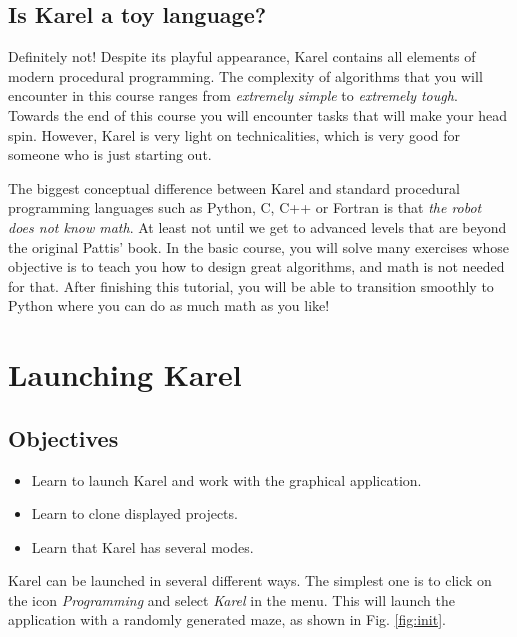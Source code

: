\subsection{Is Karel a toy language?}

Definitely not! Despite its playful appearance, Karel contains all elements 
of modern procedural programming. The complexity of algorithms 
that you will encounter in this course ranges from {\em extremely simple} 
to {\em extremely tough}. Towards the end of this course you will encounter 
tasks that will make your head spin. However, Karel is very light on 
technicalities, which is very good for someone who is just starting out.

The biggest conceptual difference between Karel and standard procedural
programming languages such as Python, C, C++ or Fortran is that {\em the robot does not 
know math}. At least not until we get to advanced levels that are beyond 
the original Pattis' book. In the basic course, you will solve many exercises 
whose objective is to teach you how to design great algorithms, and math is 
not needed for that. After finishing this tutorial, you will be able to transition 
smoothly to Python where you can do as much math as you like!
 
\section{Launching Karel}

\subsection{Objectives} 
\begin{itemize}
\item Learn to launch Karel and work with the graphical application.
\item Learn to clone displayed projects.
\item Learn that Karel has several modes.
\end{itemize}
Karel can be launched in several different ways. The simplest one is to click on the icon 
{\em Programming} and select {\em Karel} in the menu. This will launch the application 
with a randomly generated maze, as shown in Fig. \ref{fig:init}.

